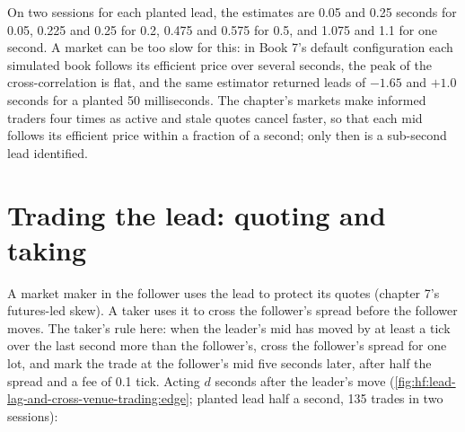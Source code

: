 \begin{omfigure}

\label{fig:hf:lead-lag-and-cross-venue-trading:ccf}
\end{omfigure}

On two sessions for each planted lead, the estimates are 0.05 and 0.25 seconds for 0.05, 0.225 and 0.25 for 0.2, 0.475 and 0.575 for 0.5, and 1.075
and 1.1 for one second. A market can be too slow for this: in Book 7's default configuration each simulated book follows its efficient price over
several seconds, the peak of the cross-correlation is flat, and the same estimator returned leads of $-1.65$ and $+1.0$ seconds for a planted 50
milliseconds. The chapter's markets make informed traders four times as active and stale quotes cancel faster, so that each mid follows its efficient
price within a fraction of a second; only then is a sub-second lead identified.

\section{Trading the lead: quoting and taking}

A market maker in the follower uses the lead to protect its quotes (chapter 7's futures-led skew). A taker uses it to cross the follower's spread
before the follower moves. The taker's rule here: when the leader's mid has moved by at least a tick over the last second more than the follower's,
cross the follower's spread for one lot, and mark the trade at the follower's mid five seconds later, after half the spread and a fee of 0.1 tick.
Acting $d$ seconds after the leader's move (\cref{fig:hf:lead-lag-and-cross-venue-trading:edge}; planted lead half a second, 135 trades in two
sessions):

